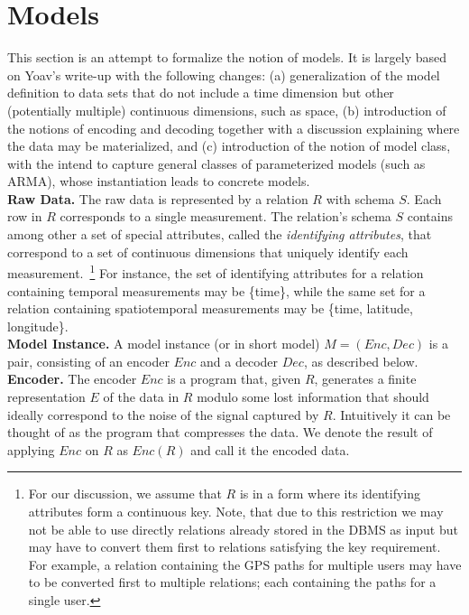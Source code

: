 \documentclass{sig-alternate}
\begin{document}
\section{Models}

This section is an attempt to formalize the notion of models. It is largely based on Yoav's write-up with the following changes: (a) generalization of the model definition to data sets that do not include a time dimension but other (potentially multiple) continuous dimensions, such as space, (b) introduction of the notions of encoding and decoding together with a discussion explaining where the data may be materialized, and (c) introduction of the notion of model class, with the intend to capture general classes of parameterized models (such as ARMA), whose instantiation leads to concrete models.\\

{\bf Raw Data.} The raw data is represented by a relation $R$ with schema $S$. Each row in $R$ corresponds to a single measurement. The relation's schema $S$ contains among other a set of special attributes, called the \emph{identifying attributes}, that correspond to a set of continuous dimensions that uniquely identify each measurement.~\footnote{For our discussion, we assume that $R$ is in a form where its identifying attributes form a continuous key. Note, that due to this restriction we may not be able to use directly relations already stored in the DBMS as input but may have to convert them first to relations satisfying the key requirement. For example, a relation containing the GPS paths for multiple users may have to be converted first to multiple relations; each containing the paths for a single user.} For instance, the set of identifying attributes for a relation containing temporal measurements may be \{time\}, while the same set for a relation containing spatiotemporal measurements may be \{time, latitude, longitude\}.\\

{\bf Model Instance.} A model instance (or in short model) $M = (Enc, Dec)$ is a pair, consisting of an encoder $Enc$ and a decoder $Dec$, as described below.\\

{\bf Encoder.} The encoder $Enc$ is a program that, given $R$, generates a finite representation $E$ of the data in $R$ modulo some lost information that should ideally correspond to the noise of the signal captured by $R$. Intuitively it can be thought of as the program that compresses the data. We denote the result of applying $Enc$ on $R$ as $Enc(R)$ and call it the encoded data.\\
\end{document}
